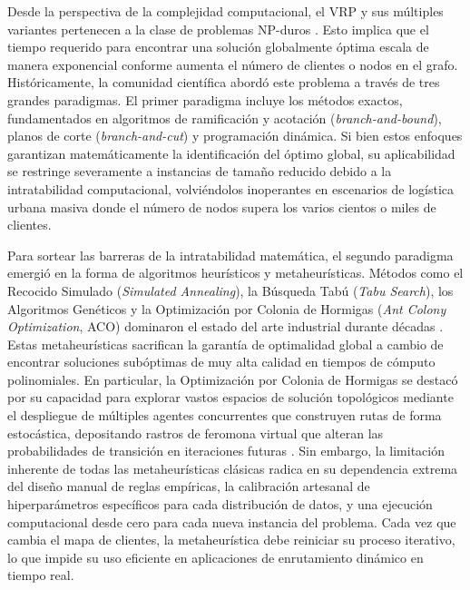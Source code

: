 \documentclass[12pt]{report}
\begin{document}
Desde la perspectiva de la complejidad computacional, el VRP y sus m\'ultiples variantes pertenecen a la clase de problemas NP-duros \cite{Lenstra1981Complexity}. Esto implica que el tiempo requerido para encontrar una soluci\'on globalmente \'optima escala de manera exponencial conforme aumenta el n\'umero de clientes o nodos en el grafo. Hist\'oricamente, la comunidad cient\'ifica abord\'o este problema a trav\'es de tres grandes paradigmas. El primer paradigma incluye los m\'etodos exactos, fundamentados en algoritmos de ramificaci\'on y acotaci\'on (\textit{branch-and-bound}), planos de corte (\textit{branch-and-cut}) y programaci\'on din\'amica. Si bien estos enfoques garantizan matem\'aticamente la identificaci\'on del \'optimo global, su aplicabilidad se restringe severamente a instancias de tama\~no reducido debido a la intratabilidad computacional, volvi\'endolos inoperantes en escenarios de log\'istica urbana masiva donde el n\'umero de nodos supera los varios cientos o miles de clientes.

Para sortear las barreras de la intratabilidad matem\'atica, el segundo paradigma emergi\'o en la forma de algoritmos heur\'isticos y metaheur\'isticas. M\'etodos como el Recocido Simulado (\textit{Simulated Annealing}), la B\'usqueda Tab\'u (\textit{Tabu Search}), los Algoritmos Gen\'eticos y la Optimizaci\'on por Colonia de Hormigas (\textit{Ant Colony Optimization}, ACO) dominaron el estado del arte industrial durante d\'ecadas \cite{Dorigo1996AntSystem}. Estas metaheur\'isticas sacrifican la garant\'ia de optimalidad global a cambio de encontrar soluciones sub\'optimas de muy alta calidad en tiempos de c\'omputo polinomiales. En particular, la Optimizaci\'on por Colonia de Hormigas se destac\'o por su capacidad para explorar vastos espacios de soluci\'on topol\'ogicos mediante el despliegue de m\'ultiples agentes concurrentes que construyen rutas de forma estoc\'astica, depositando rastros de feromona virtual que alteran las probabilidades de transici\'on en iteraciones futuras \cite{Dorigo1996AntSystem}. Sin embargo, la limitaci\'on inherente de todas las metaheur\'isticas cl\'asicas radica en su dependencia extrema del dise\~no manual de reglas emp\'iricas, la calibraci\'on artesanal de hiperpar\'ametros espec\'ificos para cada distribuci\'on de datos, y una ejecuci\'on computacional desde cero para cada nueva instancia del problema. Cada vez que cambia el mapa de clientes, la metaheur\'istica debe reiniciar su proceso iterativo, lo que impide su uso eficiente en aplicaciones de enrutamiento din\'amico en tiempo real.
\end{document}
